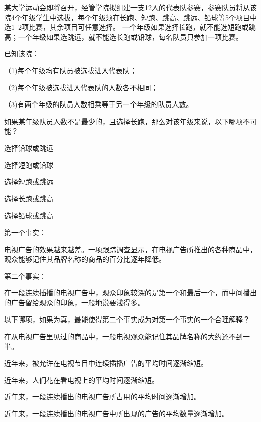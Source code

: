 \documentclass{exam-zh}
\begin{document}
\begin{question}
某大学运动会即将召开，经管学院拟组建一支12人的代表队参赛，参赛队员将从该院4个年级学生中选拔，每个年级须在长跑、短跑、跳高、跳远、铅球等5个项目中选1~2项比赛，其余项目可任意选择。
一个年级如果选择长跑，就不能选短跑或跳高；一个年级如果选跳远，就不能选长跑或铅球，每名队员只参加一项比赛。

已知该院：

（1)每个年级均有队员被选拔进入代表队；

（2)每个年级被选拔进入代表队的人数各不相同；

（3)有两个年级的队员人数相乘等于另一个年级的队员人数。

如果某年级队员人数不是最少的，且选择长跑，那么对该年级来说，以下哪项不可能？\paren[]

\begin{choices}
  \item 选择铅球或跳远
  \item 选择短跑或铅球
  \item 选择短跑或跳远
  \item 选择长跑或跳高
  \item 选择铅球或跳高
\end{choices}
\end{question}

\begin{question}
第一个事实：

电视广告的效果越来越差。一项跟踪调查显示，在电视广告所推出的各种商品中，观众能够记住其品牌名称的商品的百分比逐年降低。

第二个事实：

在一段连续插播的电视广告中，观众印象较深的是第一个和最后一个，而中间播出的广告留给观众的印象，一般地说要浅得多。

以下哪项，如果为真，最能使得第二个事实成为对第一个事实的一个合理解释？ \paren[]
\begin{choices}
  \item 在从电视广告里见过的商品中，一般电视观众能记住其品牌名称的大约还不到一半。
  \item 近年来，被允许在电视节目中连续插播广告的平均时间逐渐缩短。
  \item 近年来，人们花在看电视上的平均时间逐渐缩短。
  \item 近年来，一段连续播出的电视广告所占用的平均时间逐渐增加。
  \item 近年来，一段连续播出的电视广告中所出现的广告的平均数量逐渐增加。
\end{choices}
\end{question}
\end{document}
